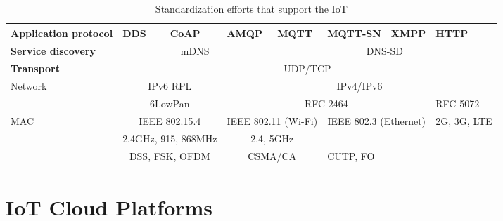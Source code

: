 \begin{table}[h!]
\scriptsize
	\begin{tabular}{l|l|l|l|l|l|l|l}

	\bf{Application protocol}& DDS                                     & CoAP                              & AMQP                              & MQTT                                & MQTT-SN & XMPP & HTTP\\\hline
	\bf{Service discovery}   & \multicolumn{3}{c}{mDNS}                & \multicolumn{4}{c}{DNS-SD}                                                                                                         \\
	\bf{Transport}           & \multicolumn{7}{c}{UDP/TCP}                                                    \\
	Network                  & \multicolumn{2}{c}{IPv6 RPL}            & \multicolumn{5}{c}{IPv4/IPv6}                            \\\hline
	\                        & \multicolumn{2}{c}{6LowPan}             & \multicolumn{4}{c}{RFC 2464}                & RFC 5072   \\\hline
	MAC                      & \multicolumn{2}{c}{IEEE 802.15.4}       & \multicolumn{2}{c}{IEEE 802.11 (Wi-Fi)} & \multicolumn{2}{c}{IEEE 802.3 (Ethernet)} & 2G, 3G, LTE\\\hline
	\                        & \multicolumn{2}{c}{2.4GHz, 915, 868MHz} & \multicolumn{2}{c}{2.4, 5GHz}           &         &              &            \\\hline
	\                        & \multicolumn{2}{c}{DSS, FSK, OFDM }     & \multicolumn{2}{c}{CSMA/CA}             & CUTP, FO               &            \\\hline
	\end{tabular}
	\caption{\label{tab:Table} Standardization efforts that support the IoT}
\end{table}






\section{IoT Cloud Platforms} %
\label{subsec:cloud_app}


